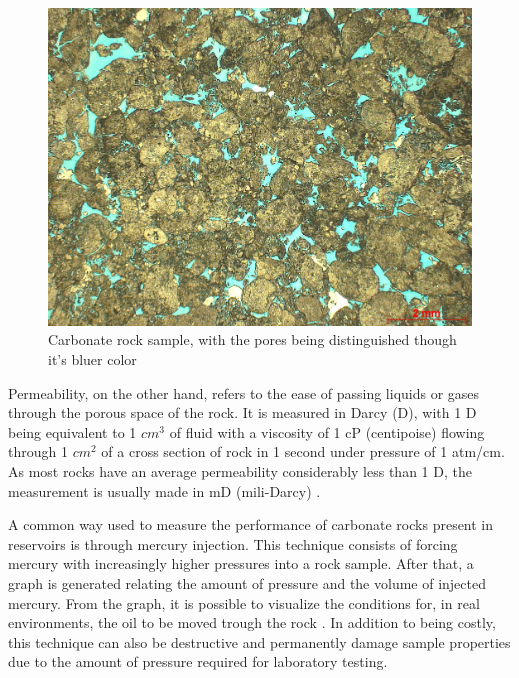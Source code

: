\documentclass[a4paper,fleqn]{cas-sc}
\begin{document}
\begin{figure}[h!]
	\caption{Carbonate rock sample, with the pores being distinguished though it's bluer color}
	\label{fig:carb_poro}
	\centering%
	\begin{minipage}{.4\textwidth}
		\includegraphics[width=\textwidth]{images/3-SPS-69_T04_5065,95_1,25x.jpg}
	\end{minipage}
\end{figure}

Permeability, on the other hand, refers to the ease of passing liquids or gases through the porous space of the rock. It is measured in Darcy (D), with 1 D being equivalent to 1 $cm^3$ of fluid with a viscosity of 1 cP (centipoise) flowing through 1 $cm^2$ of a cross section of rock in 1 second under pressure of 1 atm/cm. As most rocks have an average permeability considerably less than 1 D, the measurement is usually made in mD (mili-Darcy) \cite{Buryakovsky2012}.

A common way used to measure the performance of carbonate rocks present in reservoirs is through mercury injection. This technique consists of forcing mercury with increasingly higher pressures into a rock sample. After that, a graph is generated relating the amount of pressure and the volume of injected mercury. From the graph, it is possible to visualize the conditions for, in real environments, the oil to be moved trough the rock \cite{Harbaugh1967}. In addition to being costly, this technique can also be destructive and permanently damage sample properties due to the amount of pressure required for laboratory testing.
\end{document}
